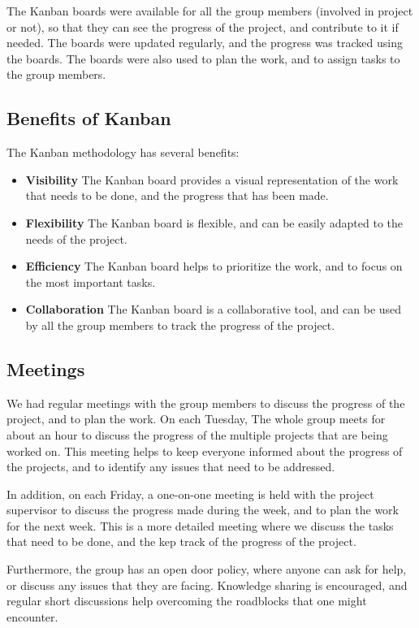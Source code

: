\begin{spacing}{1.2}
    The Kanban boards were available for all the group members (involved in project or not), so that they can see the progress
    of the project, and contribute to it if needed. The boards were updated regularly, and the progress was tracked using the
    boards. The boards were also used to plan the work, and to assign tasks to the group members.

    \subsection{Benefits of Kanban}
    The Kanban methodology has several benefits:
    \begin{itemize}
        \item \textbf{Visibility} The Kanban board provides a visual representation of the work
              that needs to be done, and the progress that has been made.
        \item \textbf{Flexibility} The Kanban board is flexible, and can be easily adapted to
              the needs of the project.
        \item \textbf{Efficiency} The Kanban board helps to prioritize the work, and to focus
              on the most important tasks.
        \item \textbf{Collaboration} The Kanban board is a collaborative tool, and can
              be used by all the group members to track the progress of the project.

    \end{itemize}

    \subsection{Meetings}
    We had regular meetings with the group members to discuss the progress of the project, and to plan the work.
    On each Tuesday, The whole group meets for about an hour to discuss the progress of the multiple projects that are being worked on.
    This meeting helps to keep everyone informed about the progress of the projects, and to identify any issues that need to be addressed.

    In addition, on each Friday, a one-on-one meeting is held with the project supervisor to discuss the progress made during the week,
    and to plan the work for the next week. This is a more detailed meeting where we discuss the tasks that need to be done, and the
    kep track of the progress of the project.

    Furthermore, the group has an open door policy, where anyone can ask for help, or discuss any issues that they are facing.
    Knowledge sharing is encouraged, and regular short discussions help overcoming the roadblocks that one might encounter.

\end{spacing}
